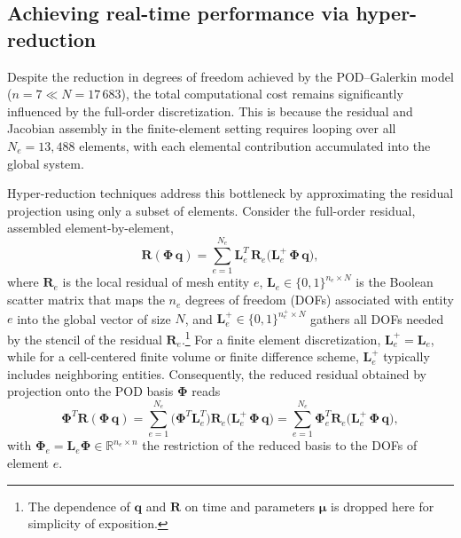 \subsection{Achieving real-time performance via hyper-reduction}
\label{sec:hrom_summary}

Despite the reduction in degrees of freedom achieved by the POD--Galerkin model (\(n = 7 \ll N = 17\,683\)), the total computational cost remains significantly influenced by the full-order discretization. This is because the residual and Jacobian assembly in the finite-element setting requires looping over all \(N_e = 13{,}488\) elements, with each elemental contribution accumulated into the global system.

Hyper-reduction techniques address this bottleneck by approximating the residual projection using only a subset of elements.  
Consider the full-order residual, assembled element-by-element,
\begin{equation}
\mathbf{R}(\boldsymbol{\Phi}\,\mathbf{q}) 
= \sum_{e=1}^{N_e} 
    \mathbf{L}_{e}^{\!T}\,
    \mathbf{R}_{e}\!\bigl(\mathbf{L}_{e}^{+}\,\boldsymbol{\Phi}\,\mathbf{q}\bigr),
\end{equation}
where \( \mathbf{R}_{e} \) is the local residual of mesh entity \(e\),  
\( \mathbf{L}_{e} \in \{0,1\}^{n_e \times N} \) is the Boolean scatter matrix that maps the \(n_e\) degrees of freedom (DOFs) associated with entity \(e\) into the global vector of size \(N\),  
and \( \mathbf{L}_{e}^{+} \in \{0,1\}^{n_e^+ \times N} \) gathers all DOFs needed by the stencil of the residual \( \mathbf{R}_{e} \).\footnote{The dependence of \( \mathbf{q} \) and \( \mathbf{R} \) on time and parameters \( \boldsymbol{\mu} \) is dropped here for simplicity of exposition.}  
For a finite element discretization, \( \mathbf{L}_{e}^{+} = \mathbf{L}_{e} \),  
while for a cell-centered finite volume or finite difference scheme, \( \mathbf{L}_{e}^{+} \) typically includes neighboring entities.  
Consequently, the reduced residual obtained by projection onto the POD basis \( \boldsymbol{\Phi} \) reads
\begin{equation}
\boldsymbol{\Phi}^{\!T}\mathbf{R}(\boldsymbol{\Phi}\,\mathbf{q}) 
= \sum_{e=1}^{N_e} 
    \bigl(\boldsymbol{\Phi}^{\!T}\mathbf{L}_{e}^{\!T}\bigr)
    \mathbf{R}_{e}\!\bigl(\mathbf{L}_{e}^{+}\,\boldsymbol{\Phi}\,\mathbf{q}\bigr)=\sum_{e=1}^{N_e}\boldsymbol{\Phi}_{e}^{\!T}
    \mathbf{R}_{e}\!\bigl(\mathbf{L}_{e}^{+}\,\boldsymbol{\Phi}\,\mathbf{q}\bigr),
\end{equation}
with \( \boldsymbol{\Phi}_{e} = \mathbf{L}_{e} \boldsymbol{\Phi} \in \mathbb{R}^{n_e \times n} \) the restriction of the reduced basis to the DOFs of element \(e\).

